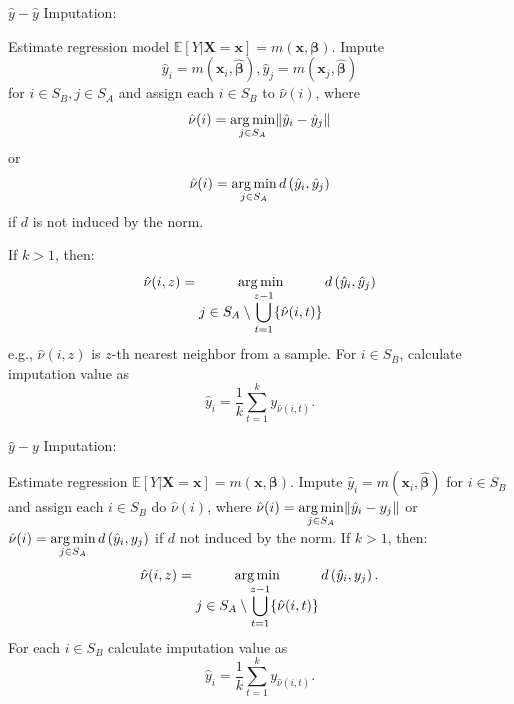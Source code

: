 \documentclass[
]{jss}
\begin{document}
\begin{algorithm}[ht!]
\caption{$\hat{y}-\hat{y}$ Imputation:}
\label{algo-3}
\begin{algorithmic}[1]
\State Estimate regression model $\mathbb{E}[Y|\boldsymbol{X}=\boldsymbol{x}]=m(\boldsymbol{x}, \boldsymbol{\beta})$.\;
\State Impute $$\hat{y}_{i}=m\left(\boldsymbol{x}_{i},\hat{\boldsymbol{\beta}}\right), 
\hat{y}_{j}=m\left(\boldsymbol{x}_{j},\hat{\boldsymbol{\beta}}\right)$$
for $i\in S_{B}, j\in S_{A}$ and assign each 
$i\in S_{B}$ to $\hat{\nu}(i)$, where
$$\displaystyle \hat{\nu}(i)=
\operatornamewithlimits{arg\,min}_{j\in S_{A}}\lVert \hat{y}_{i}-\hat{y}_{j}\rVert$$ or
$$\displaystyle \hat{\nu}(i)=
\operatornamewithlimits{arg\,min}_{j\in S_{A}}d\left(\hat{y}_{i},\hat{y}_{j}\right)$$ if $d$ is not induced by the norm.\;

\State If $k>1$, then:
$$\hat{\nu}(i, z) = \operatornamewithlimits{arg\,min}_{\displaystyle j\in S_{A}\setminus\bigcup_{t=1}^{z-1}
\{\hat{\nu}(i, t)\}} d\left(\hat{y}_{i},\hat{y}_{j}\right)$$
e.g., $\hat{\nu}(i, z)$ is $z$-th nearest neighbor from a sample.\;
\State For $i \in S_B$, calculate imputation value as 
$$
\hat{y}_i = \frac{1}{k}\sum_{t=1}^{k}y_{\hat{\nu}(i, t)}.
$$
\end{algorithmic}
\end{algorithm}

\begin{algorithm}[ht!]
\caption{$\hat{y}-y$ Imputation:}
\label{algo-4}
\begin{algorithmic}[1]
\State Estimate regression $\mathbb{E}[Y|\boldsymbol{X}=\boldsymbol{x}]=m(\boldsymbol{x}, \boldsymbol{\beta})$.\;
\State Impute $\hat{y}_{i}=m\left(\boldsymbol{x}_{i},\hat{\boldsymbol{\beta}}\right)$ 
for $i \in S_{B}$ and assign each 
$i \in S_{B}$ do $\hat{\nu}(i)$, where
$\displaystyle \hat{\nu}(i)=
\operatornamewithlimits{arg\,min}_{j \in S_{A}}\lVert \hat{y}_{i}-y_{j}\rVert$ or
$\displaystyle \hat{\nu}(i)=
\operatornamewithlimits{arg\,min}_{j \in S_{A}}d\left(\hat{y}_{i},y_{j}\right)$ 
if $d$ not induced by the norm.\;
\State If $k>1$, then:
$$\hat{\nu}(i, z) = \operatornamewithlimits{arg\,min}_{\displaystyle j \in S_{A} \setminus \bigcup_{t=1}^{z-1}
\{\hat{\nu}(i, t)\}}
d\left(\hat{y}_{i},y_{j}\right).$$
\State For each $i \in S_B$ calculate imputation value as
$$
\hat{y}_i = \frac{1}{k}\sum_{t=1}^{k}y_{\hat{\nu}(i, t)}.
$$
\end{algorithmic}
\end{algorithm}

\clearpage
\end{document}
